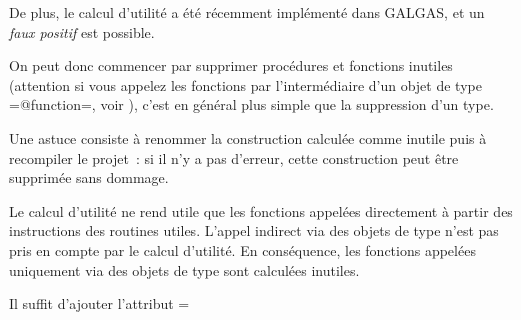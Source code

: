 De plus, le calcul d'utilité a été récemment implémenté dans GALGAS, et un \emph{faux positif} est possible.

On peut donc commencer par supprimer procédures et fonctions inutiles (attention si vous appelez les fonctions par l'intermédiaire d'un objet de type \ggst=@function=, voir ), c'est en général plus simple que la suppression d'un type.

Une astuce consiste à renommer la construction calculée comme inutile puis à recompiler le projet~: si il n'y a pas d'erreur, cette construction peut être supprimée sans dommage.



Le calcul d'utilité ne rend utile que les fonctions appelées directement à partir des instructions des routines utiles. L'appel indirect via des objets de type  n'est pas pris en compte par le calcul d'utilité. En conséquence, les fonctions appelées uniquement via des objets de type  sont calculées inutiles.

Il suffit d'ajouter l'attribut \ggst=%


